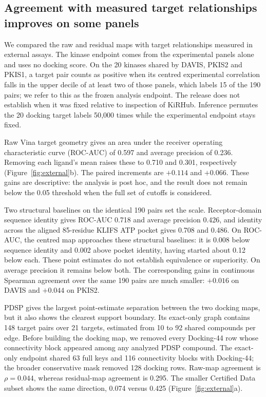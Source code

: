 \subsection{Agreement with measured target relationships improves on some panels}

We compared the raw and residual maps with target relationships measured in external assays.
The kinase endpoint comes from the experimental panels alone and uses no docking score. On the
20 kinases shared by DAVIS,
PKIS2 and PKIS1, a target pair counts as positive when its centred experimental correlation
falls in the upper decile of at least two of those panels, which labels 15 of the 190 pairs;
we refer to this as the frozen analysis endpoint. The release does not establish when it was fixed
relative to inspection of KiRHub. Inference permutes the 20 docking target labels 50{,}000 times
while the experimental endpoint stays fixed.

Raw Vina target geometry gives an area under the receiver operating characteristic curve
(ROC-AUC) of 0.597 and average precision of 0.236. Removing each ligand's mean raises these to
0.710 and 0.301, respectively (Figure~\ref{fig:external}b). The paired increments are $+0.114$
and $+0.066$. These gains are descriptive: the analysis is post hoc, and the result does not
remain below the 0.05 threshold when the full set of cutoffs is considered.

Two structural baselines on the identical 190 pairs set the scale. Receptor-domain sequence
identity gives ROC-AUC 0.718 and average precision 0.426, and identity across the aligned
85-residue KLIFS ATP pocket gives 0.708 and 0.486. On ROC-AUC, the centred map approaches these
structural baselines: it is 0.008 below sequence identity and
0.002 above pocket identity, having started about 0.12 below each. These point estimates do not
establish equivalence or superiority. On average precision it remains below
both. The corresponding gains in continuous Spearman agreement over the same 190 pairs are much
smaller: $+0.016$ on DAVIS and $+0.044$ on PKIS2.

PDSP gives the largest point-estimate separation between the two docking maps, but it also shows
the clearest support boundary. Its exact-only graph contains 148 target pairs over 21 targets,
estimated from 10 to 92 shared compounds per edge. Before building the docking map, we removed every
Docking-44 row whose connectivity block appeared among any analyzed PDSP compound. The exact-only
endpoint shared 63 full keys and 116 connectivity blocks with Docking-44; the broader conservative
mask removed 128 docking rows. Raw-map
agreement is $\rho=0.044$, whereas residual-map agreement is 0.295. The smaller Certified Data
subset shows the same direction, 0.074 versus 0.425 (Figure~\ref{fig:external}a).

